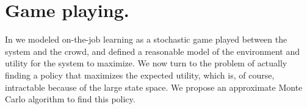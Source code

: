 %
%

\section{Game playing.}
\label{sec:game-playing}

In  we modeled on-the-job learning as a stochastic game played between the system and the crowd, and defined a reasonable model of the environment and utility for the system to maximize.
We now turn to the problem of actually finding a policy that maximizes the expected utility,
which is, of course, intractable because of the large state space.
We propose an approximate Monte Carlo algorithm to find this policy. 

